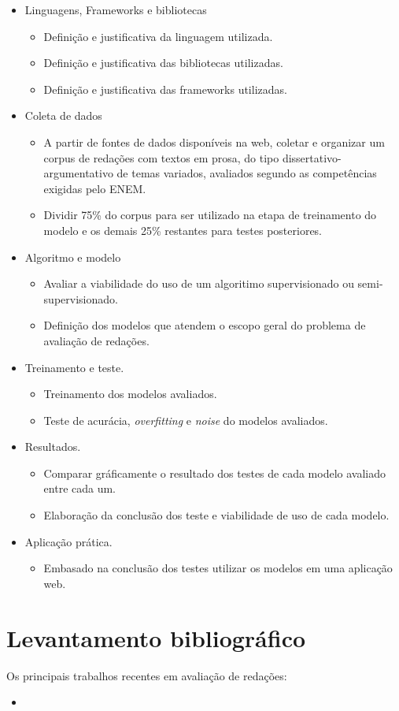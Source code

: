 \begin{itemize}
\item Linguagens, Frameworks e bibliotecas
 \begin{itemize}
  \item Definição e justificativa da linguagem utilizada.
  \item Definição e justificativa das bibliotecas utilizadas.
  \item Definição e justificativa das frameworks utilizadas.
 \end{itemize}
\item Coleta de dados
 \begin{itemize}
  \item A partir de fontes de dados disponíveis na web, coletar e organizar um corpus de redações com textos em prosa, do tipo dissertativo-argumentativo de temas variados, avaliados segundo as competências exigidas pelo ENEM.
  \item Dividir 75\% do corpus para ser utilizado na etapa de treinamento do modelo e os demais 25\% restantes para testes posteriores.
 \end{itemize}
\item Algoritmo e modelo
 \begin{itemize}
  \item Avaliar a viabilidade do uso de um algoritimo supervisionado ou semi-supervisionado.
  \item Definição dos modelos que atendem o escopo geral do problema de avaliação de redações.
 \end{itemize}
\item Treinamento e teste.
 \begin{itemize}
  \item Treinamento dos modelos avaliados.
  \item Teste de acurácia, \textit{overfitting} e \textit{noise} do modelos avaliados.
 \end{itemize}
\item Resultados.
 \begin{itemize}
  \item Comparar gráficamente o resultado dos testes de cada modelo avaliado entre cada um.
  \item Elaboração da conclusão dos teste e viabilidade de uso de cada modelo.
 \end{itemize}
\item Aplicação prática.
 \begin{itemize}
  \item Embasado na conclusão dos testes utilizar os modelos em uma aplicação web. 
 \end{itemize}
\end{itemize}

\newpage
\section{Levantamento bibliográfico}

Os principais trabalhos recentes em avaliação de redações:

\begin{itemize}
 \item {}
\end{itemize}
